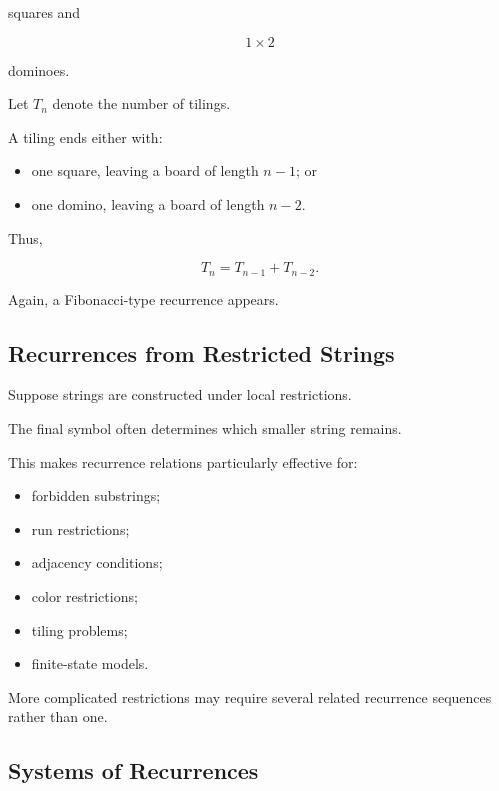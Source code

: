 squares and

\[
1\times2
\]

dominoes.

Let \(T_n\) denote the number of tilings.

A tiling ends either with:

\begin{itemize}
    \item one square, leaving a board of length \(n-1\); or
    \item one domino, leaving a board of length \(n-2\).
\end{itemize}

Thus,

\[
\boxed{
T_n=T_{n-1}+T_{n-2}.
}
\]

Again, a Fibonacci-type recurrence appears.

\subsection{Recurrences from Restricted Strings}
\label{subsec:restricted-string-recurrences}

Suppose strings are constructed under local restrictions.

The final symbol often determines which smaller string remains.

This makes recurrence relations particularly effective for:

\begin{itemize}
    \item forbidden substrings;
    \item run restrictions;
    \item adjacency conditions;
    \item color restrictions;
    \item tiling problems;
    \item finite-state models.
\end{itemize}

More complicated restrictions may require several related recurrence
sequences rather than one.

\subsection{Systems of Recurrences}
\label{subsec:systems-recurrences}

